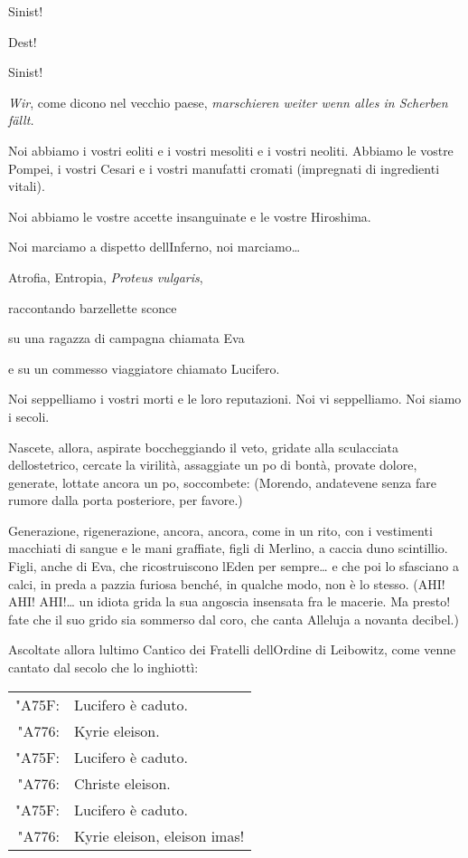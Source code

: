 	Sinist!
	
	Dest!
	
	Sinist!
	
	\emph{Wir}, come dicono nel vecchio paese, \emph{marschieren weiter wenn
		alles in Scherben fällt.}
	
	Noi abbiamo i vostri eoliti e i vostri mesoliti e i vostri neoliti.
	Abbiamo le vostre Pompei, i vostri Cesari e i vostri manufatti cromati
	(impregnati di ingredienti vitali).
	
	Noi abbiamo le vostre accette insanguinate e le vostre Hiroshima.
	
	Noi marciamo a dispetto dell\textquotesingle Inferno, noi
	marciamo\ldots{}
	
	Atrofia, Entropia, \emph{Proteus vulgaris},
	
	raccontando barzellette sconce
	
	su una ragazza di campagna chiamata Eva
	
	e su un commesso viaggiatore chiamato Lucifero.
	
	Noi seppelliamo i vostri morti e le loro reputazioni. Noi vi
	seppelliamo. Noi siamo i secoli.
	
	Nascete, allora, aspirate boccheggiando il veto, gridate alla
	sculacciata dell\textquotesingle ostetrico, cercate la virilità,
	assaggiate un po\textquotesingle{} di bontà, provate dolore, generate,
	lottate ancora un po\textquotesingle, soccombete: (Morendo, andatevene
	senza fare rumore dalla porta posteriore, per favore.)
	
	Generazione, rigenerazione, ancora, ancora, come in un rito, con i
	vestimenti macchiati di sangue e le mani graffiate, figli di Merlino, a
	caccia d\textquotesingle uno scintillio. Figli, anche di Eva, che
	ricostruiscono l\textquotesingle Eden per sempre\ldots{} e che poi lo
	sfasciano a calci, in preda a pazzia furiosa benché, in qualche modo,
	non è lo stesso. (AHI! AHI! AHI!\ldots{} un idiota grida la sua angoscia
	insensata fra le macerie. Ma presto! fate che il suo grido sia sommerso
	dal coro, che canta Alleluja a novanta decibel.)
	
	Ascoltate allora l\textquotesingle ultimo Cantico dei Fratelli
	dell\textquotesingle Ordine di Leibowitz, come venne cantato dal secolo
	che lo inghiottì:
	
	\begin{flushleft}
		\begin{tabular}{rl}
			{\LARGE\setmainfont{Andika-Regular.ttf}\char"A75F}:& Lucifero è caduto.\\ 
			{\LARGE\setmainfont{Andika-Regular.ttf}\char"A776}:& Kyrie eleison.\\ 
			{\LARGE\setmainfont{Andika-Regular.ttf}\char"A75F}:& Lucifero è caduto.\\
			{\LARGE\setmainfont{Andika-Regular.ttf}\char"A776}:& Christe eleison.\\
			{\LARGE\setmainfont{Andika-Regular.ttf}\char"A75F}:& Lucifero è caduto.\\
			{\LARGE\setmainfont{Andika-Regular.ttf}\char"A776}:& Kyrie eleison, eleison imas!
		\end{tabular}  
	\end{flushleft}
	

